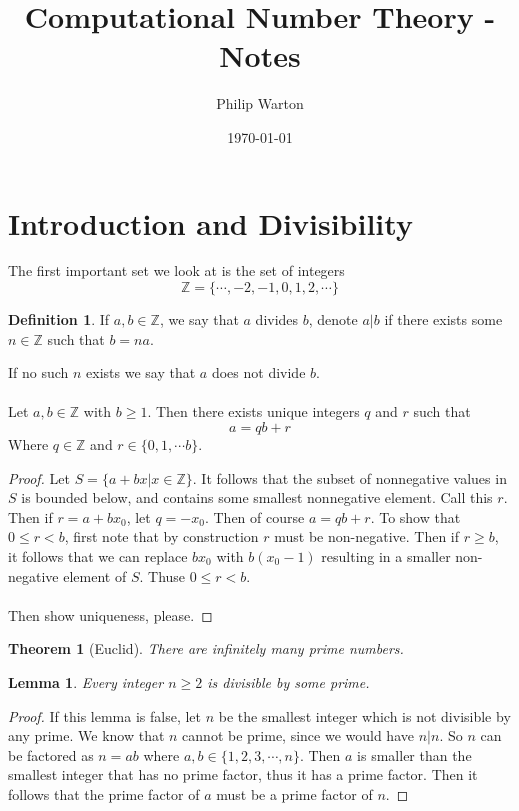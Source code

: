 \documentclass{article}
\newtheorem{theorem}{Theorem}[section]
\newtheorem{lemma}{Lemma}[section]
\theoremstyle{definition}
\newtheorem{definition}{Definition}[section]
\begin{document}
\title{Computational Number Theory - Notes}
\author{Philip Warton}
\date{\today}
\maketitle
\section{Introduction and Divisibility}
The first important set we look at is the set of integers 
\[\mathbb{Z} = \{\cdots, -2,-1,0,1,2,\cdots \}\]
\begin{mdframed}
    \begin{definition}
        If $a,b \in \mathbb{Z}$, we say that $a$ divides $b$, denote $a | b$ if there exists some $n \in \mathbb{Z}$ such that $b = na$.
    \end{definition}
\end{mdframed}
If no such $n$ exists we say that $a$ does not divide $b$.
\\\\
 Let $a,b \in \mathbb{Z}$ with $b \geqslant 1$.
Then there exists unique integers $q$ and $r$ such that 
\[
    a = qb + r
\]
Where $q \in \mathbb{Z}$ and $r \in \{0,1, \cdots b\}$.
\begin{proof}
    Let $S = \{a + bx | x \in \mathbb{Z} \}$. It follows that the subset 
    of nonnegative values in $S$ is bounded below, and contains some smallest nonnegative element.
    Call this $r$. Then if $r = a + bx_0$, let $q = -x_0$.
    Then of course $a = qb + r$. To show that $0 \leqslant r < b$, first note 
    that by construction $r$ must be non-negative. Then if $r \geqslant b$, it follows that we can replace 
    $bx_0$ with $b(x_0 - 1)$ resulting in a smaller non-negative element of $S$. Thuse $0 \leqslant r < b$.\\\\
    Then show uniqueness, please.
\end{proof}
\begin{mdframed}
    \begin{theorem}[Euclid]
        There are infinitely many prime numbers.
    \end{theorem}
\end{mdframed}
\begin{lemma}
    Every integer $n \geqslant 2$ is divisible by some prime.
\end{lemma}
\begin{proof}
If this lemma is false, let $n$ be the smallest integer which is not divisible by any prime.
We know that $n$ cannot be prime, since we would have $n | n$. 
So $n$ can be factored as $n = ab$ where $a,b \in \{1,2,3, \cdots , n\}$.
Then $a$ is smaller than the smallest integer that has no prime factor, thus it has a prime factor.
Then it follows that the prime factor of $a$ must be a prime factor of $n$.
\end{proof}
\end{document}
